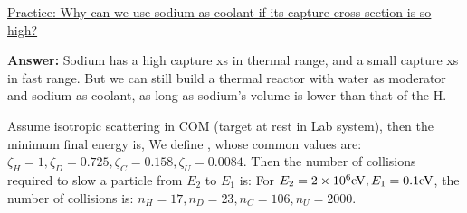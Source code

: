\documentclass{school-22.211-notes}
\begin{document}
\uline{Practice: Why can we use sodium as coolant if its capture cross section is so high?}  

\textbf{Answer:} Sodium has a high capture xs in thermal range, and a small capture xs in fast range. But we can still build a thermal reactor with water as moderator and sodium as coolant, as long as sodium's volume is lower than that of the H. 


\clearpage
Assume isotropic scattering in COM (target at rest in Lab system), then the minimum final energy is,
We define ,
whose common values are: $\zeta_{H} = 1, \zeta_D = 0.725, \zeta_C = 0.158, \zeta_U = 0.0084$. Then the number of collisions required to slow a particle from $E_2$ to $E_1$ is: 
For $E_2 = 2\times 10^6 \mathrm{eV}, E_1 = 0.1 \mathrm{eV}$, the number of collisions is: $n_H = 17, n_D = 23, n_C = 106, n_U = 2000$. 
\end{document}
